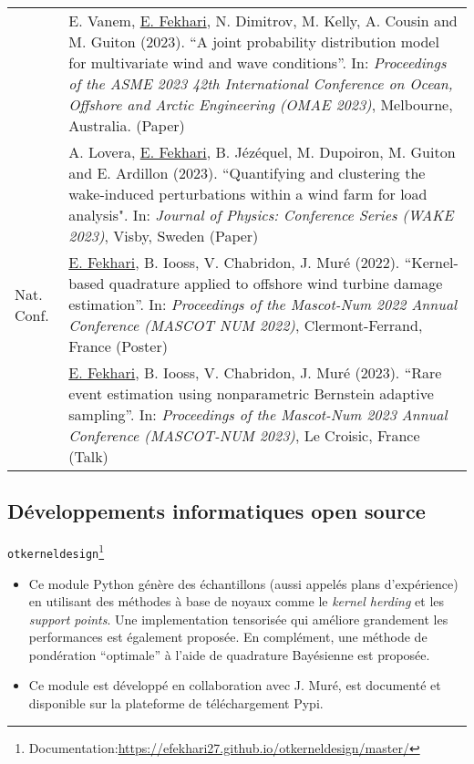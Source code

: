 \begin{center}
\begin{tabularx}{\textwidth}{l X}
                    & E. Vanem, \underline{E. Fekhari}, N. Dimitrov, M. Kelly, A. Cousin and M. Guiton (2023). 
                    ``A joint probability distribution model for multivariate wind and wave conditions''.
                    In: \textit{Proceedings of the ASME 2023 42th International Conference on Ocean, Offshore and Arctic Engineering (OMAE 2023)}, Melbourne, Australia. (Paper)\\
        
                    & A. Lovera, \underline{E. Fekhari}, B. Jézéquel, M. Dupoiron, M. Guiton and E. Ardillon (2023). 
                    ``Quantifying and clustering the wake-induced perturbations within a wind farm for load analysis". 
                    In: \textit{Journal of Physics: Conference Series (WAKE 2023)}, Visby, Sweden (Paper)\\
        \hline
        Nat. Conf.  & \underline{E. Fekhari}, B. Iooss, V. Chabridon, J. Muré (2022).
                    ``Kernel-based quadrature applied to offshore wind turbine damage estimation''. 
                    In: \textit{Proceedings of the Mascot-Num 2022 Annual Conference (MASCOT NUM 2022)}, Clermont-Ferrand, France (Poster)\\
        
                    & \underline{E. Fekhari}, B. Iooss, V. Chabridon, J. Muré (2023).
                    ``Rare event estimation using nonparametric Bernstein adaptive sampling''. 
                    In: \textit{Proceedings of the Mascot-Num 2023 Annual Conference (MASCOT-NUM 2023)}, Le Croisic, France (Talk)\\
                    
        \end{tabularx}
\end{center}

\newpage
\subsection{Développements informatiques open source}

\texttt{otkerneldesign}\footnote{Documentation:\url{https://efekhari27.github.io/otkerneldesign/master/}}
\begin{itemize}
    \item[\textbullet] Ce module Python génère des échantillons (aussi appelés plans d'expérience) en utilisant des méthodes à base de noyaux comme le \textit{kernel herding} et les \textit{support points}. Une implementation tensorisée qui améliore grandement les performances est également proposée. En complément, une méthode de pondération ``optimale'' à l'aide de quadrature Bayésienne est proposée. 
    \item[\textbullet] Ce module est développé en collaboration avec J. Muré, est documenté et disponible sur la plateforme de téléchargement Pypi.
\end{itemize}


